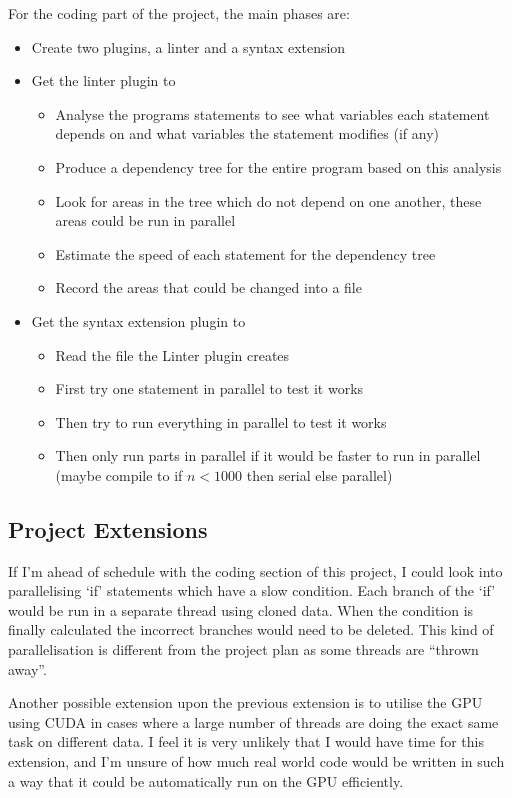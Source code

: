 \documentclass[12pt, a4paper]{article}
\begin{document}
For the coding part of the project, the main phases are:
\begin{itemize}
	\item Create two plugins, a linter and a syntax extension
	\item Get the linter plugin to
	\begin{itemize}
		\item Analyse the programs statements to see what variables each statement depends on and what variables the statement modifies (if any)
		\item Produce a dependency tree for the entire program based on this analysis
		\item Look for areas in the tree which do not depend on one another, these areas could be run in parallel
		\item Estimate the speed of each statement for the dependency tree
		\item Record the areas that could be changed into a file
	\end{itemize}
	\item Get the syntax extension plugin to
	\begin{itemize}
		\item Read the file the Linter plugin creates
		\item First try one statement in parallel to test it works
		\item Then try to run everything in parallel to test it works
		\item Then only run parts in parallel if it would be faster to run in parallel (maybe compile to if $n < 1000$ then serial else parallel)
	\end{itemize}

\end{itemize}

\subsection{Project Extensions}
If I'm ahead of schedule with the coding section of this project, I could look into parallelising `if' statements which have a slow condition. Each branch of the `if' would be run in a separate thread using cloned data. When the condition is finally calculated the incorrect branches would need to be deleted. This kind of parallelisation is different from the project plan as some threads are ``thrown away''.

Another possible extension upon the previous extension is to utilise the GPU using CUDA in cases where a large number of threads are doing the exact same task on different data. I feel it is very unlikely that I would have time for this extension, and I'm unsure of how much real world code would be written in such a way that it could be automatically run on the GPU efficiently.
\end{document}
